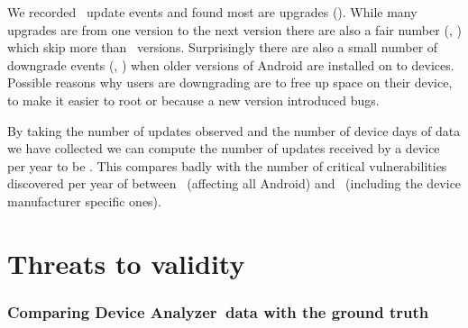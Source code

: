 \documentclass{llncs}
\newcommand{\da}{Device Analyzer}
\begin{document}
We recorded \daNumFullVersionUpdates\ update events and found most are upgrades (\daNumUpdatesUpgrades).
While many upgrades are from one version to the next version there are also a fair number (\daNumUpdatesBigUpgrades, \daPercBigUpgradesNominal) which skip more than \daNumUpdatesSkippedBig\ versions.
Surprisingly there are also a small number of downgrade events (\daNumUpdatesDowngrades, \daPercUpdatesDowngradesNominal) when older versions of Android are installed on to devices.
Possible reasons why users are downgrading are to free up space on their device, to make it easier to root or because a new version introduced bugs.


By taking the number of updates observed and the number of device days of data we have collected we can compute the number of updates received by a device per year to be \daUpdatesPerYear.
This compares badly with the number of critical vulnerabilities discovered per year of between \avoVulnsPerYearAllAndroid\ (affecting all Android) and \avoVulnsPerYear\ (including the device manufacturer specific ones).

\section{Threats to validity}
\label{sec:validity}
\subsubsection{Comparing \da\ data with the ground truth}
\label{sec:representative}
\end{document}
